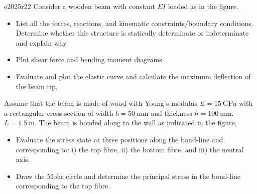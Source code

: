 \begin{problemwithimage}[0.45\linewidth]{e2025r2}{2}
  Consider a wooden beam with constant $EI$ loaded as in the figure.

  \begin{itemize}
    \item[Q2.1] List all the forces, reactions, and kinematic constraints/boundary conditions.
      Determine whether this structure is statically determinate or indeterminate and explain why.
    \item[Q2.2] Plot shear force and bending moment diagrams.
    \item[Q2.3] Evaluate and plot the elastic curve and calculate the maximum deflection of the beam tip.
  \end{itemize}

  Assume that the beam is made of wood with Young's modulus $E = \qty{15}{\GPa}$ with a rectangular cross-section of width $b = \qty{50}{\mm}$ and thickness $h = \qty{100}{\mm}$. $L = \qty{1,5}{\m}$.
  The beam is bonded along to the wall as indicated in the figure.

  \begin{itemize}
    \item[Q2.4] Evaluate the stress state at three positions along the bond-line and corresponding to: i) the top fibre, ii) the bottom fibre, and iii) the neutral axis.
    \item[Q2.5] Draw the Mohr circle and determine the principal stress in the bond-line corresponding to the top fibre.
  \end{itemize}
\end{problemwithimage}

